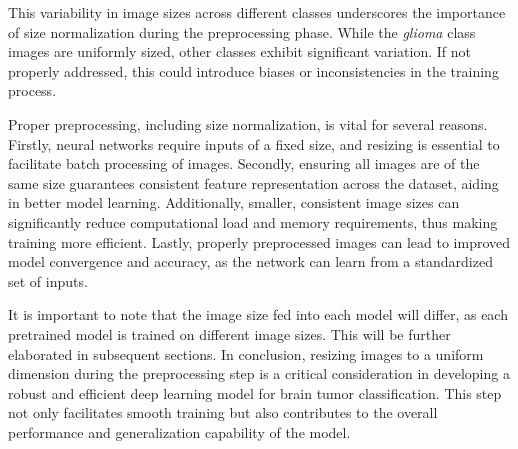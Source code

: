 This variability in image sizes across different classes underscores the importance of size normalization during the preprocessing phase. While the \textit{glioma} class images are uniformly sized, other classes exhibit significant variation. If not properly addressed, this could introduce biases or inconsistencies in the training process.

Proper preprocessing, including size normalization, is vital for several reasons. Firstly, neural networks require inputs of a fixed size, and resizing is essential to facilitate batch processing of images. Secondly, ensuring all images are of the same size guarantees consistent feature representation across the dataset, aiding in better model learning. Additionally, smaller, consistent image sizes can significantly reduce computational load and memory requirements, thus making training more efficient. Lastly, properly preprocessed images can lead to improved model convergence and accuracy, as the network can learn from a standardized set of inputs.

It is important to note that the image size fed into each model will differ, as each pretrained model is trained on different image sizes. This will be further elaborated in subsequent sections. In conclusion, resizing images to a uniform dimension during the preprocessing step is a critical consideration in developing a robust and efficient deep learning model for brain tumor classification. This step not only facilitates smooth training but also contributes to the overall performance and generalization capability of the model.

